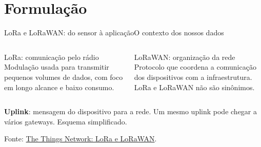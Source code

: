 \documentclass[aspectratio=169,10pt]{beamer}
\begin{document}
\section{Formulação}
\begin{frame}{LoRa e LoRaWAN: do sensor à aplicação}{O contexto dos nossos dados}
\begin{columns}[T]
\begin{block}{LoRa: comunicação pelo rádio}
Modulação usada para transmitir pequenos volumes de dados, com foco em longo alcance e baixo consumo.
\end{block}
\begin{block}{LoRaWAN: organização da rede}
Protocolo que coordena a comunicação dos dispositivos com a infraestrutura. LoRa e LoRaWAN não são sinônimos.
\end{block}
\end{columns}
\vspace{3mm}
\centering
{}
\par\vspace{3mm}
\raggedright
\small \textbf{Uplink}: mensagem do dispositivo para a rede. Um mesmo uplink pode chegar a vários gateways. Esquema simplificado.
\par\scriptsize Fonte: \href{https://www.thethingsnetwork.org/docs/lorawan/what-is-lorawan/}{The Things Network: LoRa e LoRaWAN}.
\end{frame}
\end{document}
